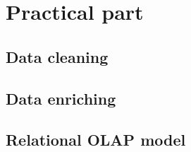 \section{Practical part}

\subsection{Data cleaning}

\subsection{Data enriching}

\subsection{Relational OLAP model}